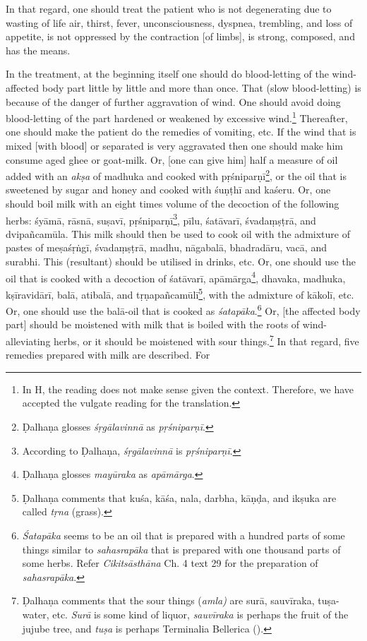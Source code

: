 \begin{translation}
    \item[6]
    In that regard, one should treat the patient who is not degenerating due to wasting of life air, thirst, fever, unconsciousness, dyspnea, trembling, and loss of appetite, is not oppressed by the contraction [of limbs], is strong, composed, and has the means.

    \item[7]
    In the treatment, at the beginning itself one should do blood-letting of the wind-affected body part little by little and more than once. That (slow blood-letting) is because of the danger of further aggravation of wind. One should avoid doing blood-letting of the part hardened or weakened by excessive wind.\footnote{In H, the reading  does not make sense given the context. Therefore, we have accepted the vulgate reading  for the translation.} Thereafter, one should make the patient do the remedies of vomiting, etc. If the wind that is mixed [with blood] or separated is very aggravated then one should make him consume aged ghee or goat-milk. Or, [one can give him] half a measure of oil added with an \textit{akṣa} of \gls{madhuka} and cooked with \gls{pṛśniparṇī}\footnote{Ḍalhaṇa glosses \citep[425]{vulgate} \emph{śṛgālavinnā} as \emph{pṛśniparṇī}.}, or the oil that is sweetened by sugar and honey and cooked with \gls{śuṇṭhī} and \gls{kaśeru}. Or, one should boil milk with an eight times volume of the decoction of the following herbs: \gls{śyāmā}, \gls{rāsnā}, \gls{suṣavī}, \gls{pṛśniparṇī}\footnote{According to Ḍalhaṇa, \emph{śṛgālavinnā} is \emph{pṛśniparṇī}.}, \gls{pīlu}, \gls{śatāvarī}, \gls{śvadaṃṣṭrā}, and \gls{dvipañcamūla}. This milk should then be used to cook oil with the admixture of pastes of \gls{meṣaśṛṅgī}, \gls{śvadaṃṣṭrā}, \gls{madhu}, \gls{nāgabalā}, \gls{bhadradāru}, \gls{vacā}, and \gls{surabhi}. This (resultant) should be utilised in drinks, etc. Or, one should use the oil that is cooked with a decoction of \gls{śatāvarī}, \gls{apāmārga}\footnote{Ḍalhaṇa glosses \citep[425]{vulgate} \textit{mayūraka} as \textit{apāmārga}.}, \gls{dhavaka}, \gls{madhuka}, \gls{kṣīravidārī}, \gls{balā}, \gls{atibalā}, and \gls{tṛṇapañcamūlī}\footnote{Ḍalhaṇa comments \citep[425]{vulgate} that \gls{kuśa}, \gls{kāśa}, \gls{nala}, \gls{darbha}, \gls{kāṇḍa}, and \gls{ikṣuka} are called \textit{tṛna} (grass).}, with the admixture of \gls{kākolī}, etc. Or, one should use the \gls{balā}-oil that is cooked as \emph{śatapāka}.\footnote{\emph{Śatapāka} seems to be an oil that is prepared with a hundred parts of some things similar to \textit{sahasrapāka} that is prepared with one thousand parts of some herbs. Refer \textit{Cikitsāsthāna} Ch. 4 text 29 for the preparation of \textit{sahasrapāka}.} Or, [the affected body part] should be moistened with milk that is boiled with the roots of wind-alleviating herbs, or it should be moistened with sour things.\footnote{Ḍalhaṇa comments \citep[425]{vulgate} that the sour things (\textit{amla)} are \gls{surā}, \gls{sauvīraka}, \gls{tuṣa}-water, etc. \textit{Surā} is some kind of liquor, \textit{sauvīraka} is perhaps the fruit of the jujube tree, and \textit{tuṣa} is perhaps Terminalia Bellerica ().} In that regard, five remedies prepared with milk are described. For 
\end{translation}
